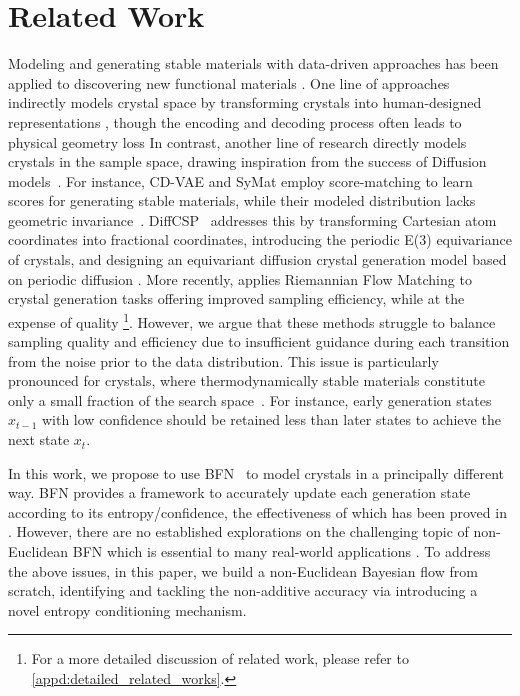 \section{Related Work}
Modeling and generating stable materials with data-driven approaches has been applied to discovering new functional materials \citep{peng2022human}. One line of approaches indirectly models crystal space by transforming crystals into human-designed representations \citep{REN2021,hoffmann2019data,noh2019inverse, court20203,yang2023scalable}, though the encoding and decoding process often leads to physical geometry loss 
In contrast, another line of research directly models crystals in the sample space, drawing inspiration from the success of Diffusion models~\citep{ho2020denoising,song2020score,song2019generative}. For instance, CD-VAE \citep{xie2021crystal} and SyMat \citep{luo2024towards} employ score-matching \citep{song2019generative} to learn scores for generating stable materials, while their modeled distribution lacks geometric invariance~\citep{zhang2023artificial}. DiffCSP~\citep{jiao2023crystal} addresses this by transforming Cartesian atom coordinates into fractional coordinates, introducing the periodic E(3) equivariance of crystals, and designing an equivariant diffusion crystal generation model based on periodic diffusion \citep{jing2022torsional}. More recently, \citet{flowmm} applies Riemannian Flow Matching \citep{riemannianfm} to crystal generation tasks offering improved sampling efficiency, while at the expense of quality \footnote{For a more detailed discussion of related work, please refer to \cref{appd:detailed_related_works}.}. However, we argue that these methods struggle to balance sampling quality and efficiency due to insufficient guidance during each transition from the noise prior to the data distribution. This issue is particularly pronounced for crystals, where thermodynamically stable materials constitute only a small fraction of the search space~\citep{flowmm}. For instance, early generation states $x_{t-1}$ with low confidence should be retained less than later states to achieve the next state $x_{t}$. 


In this work, we propose to use BFN~\citep{bfn} to model crystals in a principally different way. BFN provides a framework to accurately update each generation state according to its entropy/confidence, the effectiveness of which has been proved in \citet{song2023unified}. 
However, there are no established explorations on the challenging topic of non-Euclidean BFN which is essential to many real-world applications \cite{jing2022torsional, AlphaFold2021}. 
To address the above issues, in this paper, we build a non-Euclidean Bayesian flow from scratch, identifying and tackling the non-additive accuracy via introducing a novel entropy conditioning mechanism.
 




